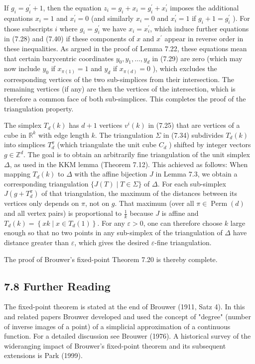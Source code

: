 \documentclass[12pt]{article}
\begin{document}
If $g_{i}=g_{i}^{\prime}+1$, then the equation $z_{i}=g_{i}+x_{i}=g_{i}^{\prime}+x_{i}^{\prime}$ imposes the additional equations $x_{i}=1$ and $x_{i}^{\prime}=0$ (and similarly $x_{i}=0$ and $x_{i}^{\prime}=1$ if $g_{i}+1=g_{i}^{\prime}$ ). For those subscripts $i$ where $g_{i}=g_{i}^{\prime}$ we have $x_{i}=x_{i}^{\prime}$, which induce further equations in (7.28) and (7.40) if these components of $x$ and $x^{\prime}$ appear in reverse order in these inequalities. As argued in the proof of Lemma 7.22, these equations mean that certain barycentric coordinates $y_{0}, y_{1}, \ldots, y_{d}$ in (7.29) are zero (which may now include $y_{0}$ if $x_{\pi(1)}=1$ and $y_{d}$ if $x_{\pi(d)}=0$ ), which excludes the corresponding vertices of the two sub-simplices from their intersection. The remaining vertices (if any) are then the vertices of the intersection, which is therefore a common face of both sub-simplices. This completes the proof of the triangulation property.

The simplex $T_{d}(k)$ has $d+1$ vertices $v^{i}(k)$ in (7.25) that are vertices of a cube in $\mathbb{R}^{k}$ with edge length $k$. The triangulation $\Sigma$ in (7.34) subdivides $T_{d}(k)$ into simplices $T_{d}^{\pi}$ (which triangulate the unit cube $C_{d}$ ) shifted by integer vectors $g \in \mathbb{Z}^{d}$. The goal is to obtain an arbitrarily fine triangulation of the unit simplex $\Delta$, as used in the KKM lemma (Theorem 7.12). This achieved as follows: When mapping $T_{d}(k)$ to $\Delta$ with the affine bijection $J$ in Lemma 7.3, we obtain a corresponding triangulation $\{J(T) \mid T \in \Sigma\}$ of $\Delta$. For each sub-simplex $J\left(g+T_{d}^{\pi}\right)$ of that triangulation, the maximum of the distances between its vertices only depends on $\pi$, not on $g$. That maximum (over all $\pi \in \operatorname{Perm}(d)$ and all vertex pairs) is proportional to $\frac{1}{k}$ because $J$ is affine and $T_{d}(k)=\left\{x k \mid x \in T_{d}(1)\right\}$. For any $\varepsilon>0$, one can therefore choose $k$ large enough so that no two points in any sub-simplex of the triangulation of $\Delta$ have distance greater than $\varepsilon$, which gives the desired $\varepsilon$-fine triangulation.

The proof of Brouwer's fixed-point Theorem 7.20 is thereby complete.

\subsection*{7.8 Further Reading}
The fixed-point theorem is stated at the end of Brouwer (1911, Satz 4). In this and related papers Brouwer developed and used the concept of "degree" (number of inverse images of a point) of a simplicial approximation of a continuous function. For a detailed discussion see Brouwer (1976). A historical survey of the wideranging impact of Brouwer's fixed-point theorem and its subsequent extensions is Park (1999).
\end{document}
